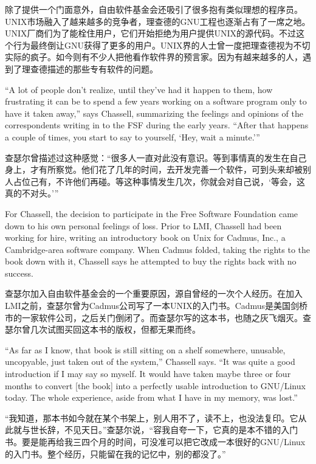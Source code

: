 \ifdefined\chs
除了提供一个门面意外，自由软件基金会还吸引了很多抱有类似理想的程序员。UNIX市场融入了越来越多的竞争者，理查德的GNU工程也逐渐占有了一席之地。UNIX厂商们为了能栓住用户，它们开始拒绝为用户提供UNIX的源代码。不过这个行为最终倒让GNU获得了更多的用户。UNIX界的人士曾一度把理查德视为不切实际的疯子。如今则有不少人把他看作软件界的预言家。因为有越来越多的人，遇到了理查德描述的那些专有软件的问题。
\fi

\ifdefined\eng
``A lot of people don't realize, until they've had it happen to them, how frustrating it can be to spend a few years working on a software program only to have it taken away,'' says Chassell, summarizing the feelings and opinions of the correspondents writing in to the FSF during the early years. ``After that happens a couple of times, you start to say to yourself, `Hey, wait a minute.'\hspace{0.01in}''
\fi

\ifdefined\chs
查瑟尔曾描述过这种感觉：``很多人一直对此没有意识。等到事情真的发生在自己身上，才有所察觉。他们花了几年的时间，去开发完善一个软件，可到头来却被别人占位己有，不许他们再碰。等这种事情发生几次，你就会对自己说，`等会，这真的不对头。'\hspace{0.01in}''
\fi

\ifdefined\eng
For Chassell, the decision to participate in the Free Software Foundation came down to his own personal feelings of loss. Prior to LMI, Chassell had been working for hire, writing an introductory book on Unix for Cadmus, Inc., a Cambridge-area software company. When Cadmus folded, taking the rights to the book down with it, Chassell says he attempted to buy the rights back with no success.
\fi

\ifdefined\chs
查瑟尔加入自由软件基金会的一个重要原因，源自曾经的一次个人经历。在加入LMI之前，查瑟尔曾为Cadmus公司写了一本UNIX的入门书。Cadmus是美国剑桥市的一家软件公司，之后关门倒闭了。而查瑟尔写的这本书，也随之灰飞烟灭。查瑟尔曾几次试图买回这本书的版权，但都无果而终。
\fi

\ifdefined\eng
``As far as I know, that book is still sitting on a shelf somewhere, unusable, uncopyable, just taken out of the system,'' Chassell says. ``It was quite a good introduction if I may say so myself. It would have taken maybe three or four months to convert [the book] into a perfectly usable introduction to GNU/Linux today. The whole experience, aside from what I have in my memory, was lost.''
\fi

\ifdefined\chs
``我知道，那本书如今就在某个书架上，别人用不了，读不上，也没法复印。它从此就与世长辞，不见天日。''查瑟尔说，``容我自夸一下，它真的是本不错的入门书。要是能再给我三四个月的时间，可没准可以把它改成一本很好的GNU/Linux的入门书。整个经历，只能留在我的记忆中，别的都没了。''
\fi

